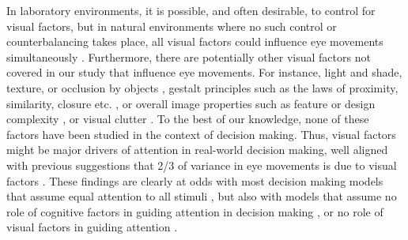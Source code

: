  In laboratory environments, it is possible, and often desirable, to control for visual factors, but in natural environments where no such control or counterbalancing takes place, all visual factors could influence eye movements simultaneously \citep{gidloef2017a, orquin2019a}. Furthermore, there are potentially other visual factors not covered in our study that influence eye movements. For instance, light and shade, texture, or occlusion by objects \citep{geisler2008}, gestalt principles such as the laws of proximity, similarity, closure etc. \citep{wagemans2012}, or overall image properties such as feature or design complexity \citep{pieters2010a}, or visual clutter \citep{rosenholtz2007a}. To the best of our knowledge, none of these factors have been studied in the context of decision making. Thus, visual factors might be major drivers of attention in real-world decision making, well aligned with previous suggestions that 2/3 of variance in eye movements is due to visual factors \citep{vanderlans2008}. These findings are clearly at odds with most decision making models that assume equal attention to all stimuli \citep{tversky1979,payne1988, simon1956a}, but also with models that assume no role of cognitive factors in guiding attention in decision making \citep{busemeyer1992, krajbich2010a}, or no role of visual factors in guiding attention \citep{callaway2019a, gloeckner2011a, gluth2018, gluth2020}.

